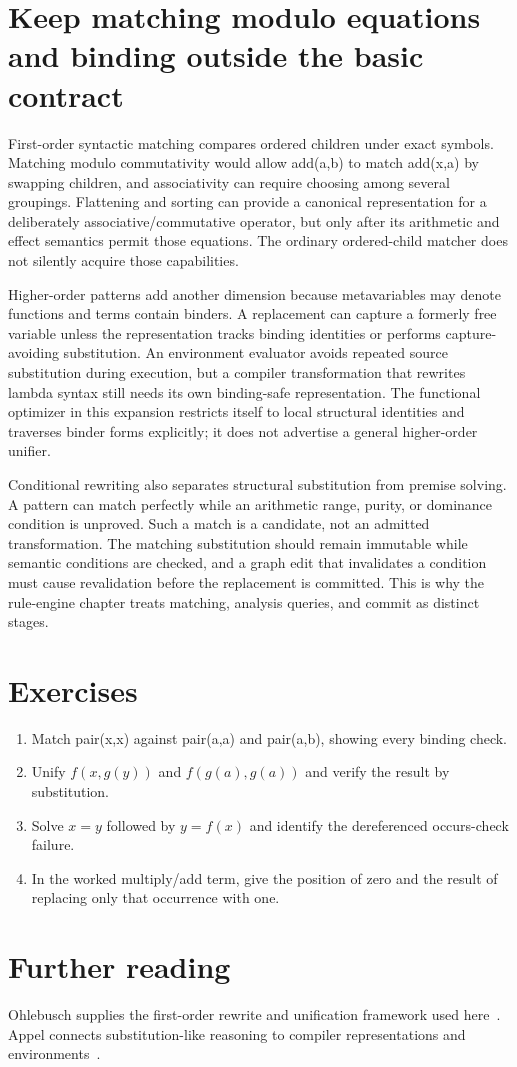 \section{Keep matching modulo equations and binding outside the basic contract}
\label{sec:ch82-modulo}
First-order syntactic matching compares ordered children under exact symbols.
Matching modulo commutativity would allow add(a,b) to match add(x,a) by swapping children, and associativity can require choosing among several groupings.
Flattening and sorting can provide a canonical representation for a deliberately associative/commutative operator, but only after its arithmetic and effect semantics permit those equations.
The ordinary ordered-child matcher does not silently acquire those capabilities.

Higher-order patterns add another dimension because metavariables may denote functions and terms contain binders.
A replacement can capture a formerly free variable unless the representation tracks binding identities or performs capture-avoiding substitution.
An environment evaluator avoids repeated source substitution during execution, but a compiler transformation that rewrites lambda syntax still needs its own binding-safe representation.
The functional optimizer in this expansion restricts itself to local structural identities and traverses binder forms explicitly; it does not advertise a general higher-order unifier.

Conditional rewriting also separates structural substitution from premise solving.
A pattern can match perfectly while an arithmetic range, purity, or dominance condition is unproved.
Such a match is a candidate, not an admitted transformation.
The matching substitution should remain immutable while semantic conditions are checked, and a graph edit that invalidates a condition must cause revalidation before the replacement is committed.
This is why the rule-engine chapter treats matching, analysis queries, and commit as distinct stages.

\section{Exercises}
\label{sec:ch82-exercises}
\begin{enumerate}
\item\label{ex:ch82-match} Match pair(x,x) against pair(a,a) and pair(a,b), showing every binding check.
\item\label{ex:ch82-unify} Unify $f(x,g(y))$ and $f(g(a),g(a))$ and verify the result by substitution.
\item\label{ex:ch82-occurs} Solve $x=y$ followed by $y=f(x)$ and identify the dereferenced occurs-check failure.
\item\label{ex:ch82-position} In the worked multiply/add term, give the position of zero and the result of replacing only that occurrence with one.
\end{enumerate}

\section{Further reading}
\label{sec:ch82-reading}
Ohlebusch supplies the first-order rewrite and unification framework used here~\cite{ohlebusch-2002-rewriting}.
Appel connects substitution-like reasoning to compiler representations and environments~\cite{appel-1998-modern}.
